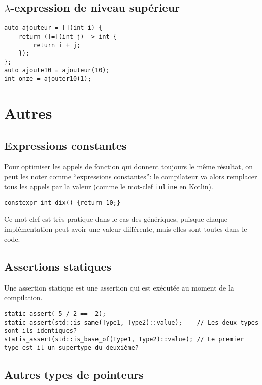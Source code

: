 \documentclass[10pt,a4paper,french]{article}
\let\oldpart\part
\renewcommand\part{\newpage\oldpart}
\begin{document}
\subsection{$\lambda$-expression de niveau supérieur}

\begin{verbatim}
auto ajouteur = [](int i) {
    return ([=](int j) -> int {
        return i + j;
    });
};
auto ajoute10 = ajouteur(10);
int onze = ajouter10(1);
\end{verbatim}

\section{Autres}

\subsection{Expressions constantes}

Pour optimiser les appels de fonction qui donnent toujours le même résultat, on peut les noter comme ``expressions constantes'': le compilateur va alors remplacer tous les appels par la valeur (comme le mot-clef \texttt{inline} en Kotlin).

\begin{verbatim}
constexpr int dix() {return 10;}
\end{verbatim}

Ce mot-clef est très pratique dans le cas des génériques, puisque chaque implémentation peut avoir une valeur différente, mais elles sont toutes dans le code.

\subsection{Assertions statiques}

Une assertion statique est une assertion qui est exécutée au moment de la compilation.

\begin{verbatim}
static_assert(-5 / 2 == -2);
static_assert(std::is_same(Type1, Type2)::value);    // Les deux types sont-ils identiques?
statis_assert(std::is_base_of(Type1, Type2)::value); // Le premier type est-il un supertype du deuxième?
\end{verbatim}

\subsection{Autres types de pointeurs}

\appendix %

\end{document}
